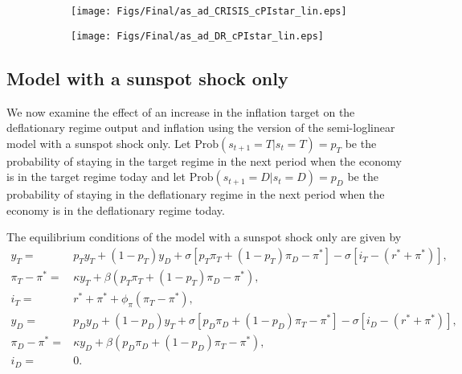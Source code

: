\documentclass[11pt]{article}
\begin{document}
\begin{singlespace}
		\begin{figure}[h]
			\caption{AD and AS Curves in the Crisis State and in the Deflationary Regime\\---Semi-Loglinear Model---} \label{fig:ASAD_semi}
	        \vspace{-1em}
			\begin{center}
				\begin{subfigure}[b]{0.4\textwidth}
					\centering
					\texttt{[image: Figs/Final/as\_ad\_CRISIS\_cPIstar\_lin.eps]}
				\end{subfigure}
				\hspace{0.5cm}     
				\begin{subfigure}[b]{0.42\textwidth}
					\centering
					\texttt{[image: Figs/Final/as\_ad\_DR\_cPIstar\_lin.eps]}
				\end{subfigure}
			\end{center}
		\end{figure}
		
		\subsection{Model with a sunspot shock only}
		
		We now examine the effect of an increase in the inflation target on the deflationary regime output and inflation using the version of the semi-loglinear model with a sunspot shock only. Let $\text{Prob}(s_{t+1}=T|s_{t}=T) = p_T$ be the probability of staying in the target regime in the next period when the economy is in the target regime today and let $\text{Prob}(s_{t+1}=D|s_{t}=D) = p_D$ be the probability of staying in the deflationary regime in the next period when the economy is in the deflationary regime today.
		
		\noindent The equilibrium conditions of the model with a sunspot shock only are given by
		\begin{align}
			y_{T} =& p_T y_T + (1-p_T)y_D +  \sigma\left[p_T \pi_T + (1-p_T)\pi_D - \pi^* \right] - \sigma\left[i_T - (r^* + \pi^*)\right],\label{ee_edlt}\\
			\pi_{T} - \pi^* =& \kappa y_T + \beta\left(p_T \pi_T + (1-p_T)\pi_D - \pi^*\right),\\
			i_T =& r^* + \pi^* + \phi_{\pi}(\pi_T - \pi^*),\\
			y_{D} =& p_D y_D + (1-p_D)y_T +  \sigma\left[p_D \pi_D + (1-p_D)\pi_T - \pi^*\right] - \sigma\left[i_D - (r^* + \pi^*)\right],\\
			\pi_{D} - \pi^* =& \kappa y_D + \beta\left(p_D \pi_D + (1-p_D)\pi_T - \pi^*\right),\\
			i_D =& 0. \label{i_edlt}
		\end{align}
		

\end{singlespace}
\end{document}
